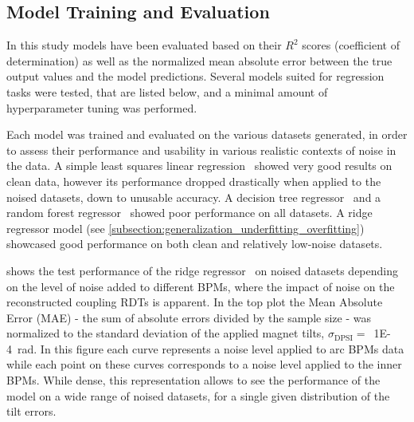 \subsection{Model Training and Evaluation}

In this study models have been evaluated based on their \(R^2\) scores (coefficient of determination) as well as the normalized mean absolute error between the true output values and the model predictions.
Several models suited for regression tasks were tested, that are listed below, and a minimal amount of hyperparameter tuning was performed.

Each model was trained and evaluated on the various datasets generated, in order to assess their performance and usability in various realistic contexts of noise in the data. 
A simple least squares linear regression~\cite{PNAS:Lai:Strong_Consistency_Least_Squares_Estimates_Regression_Models} showed very good results on clean data, however its performance dropped drastically when applied to the noised datasets, down to unusable accuracy.
A decision tree regressor~\cite{BOOK:Breiman:Classification_Regression_Trees} and a random forest regressor~\cite{ML:Breiman:Random_Forests} showed poor performance on all datasets.
A ridge regressor model (see \cref{subsection:generalization_underfitting_overfitting}) showcased good performance on both clean and relatively low-noise datasets.

 shows the test performance of the ridge regressor~\cite{MIT:Rifkin:Regularized_Least_Squares} on noised datasets depending on the level of noise added to different BPMs, where the impact of noise on the reconstructed coupling RDTs is apparent.
In the top plot the Mean Absolute Error (MAE) - the sum of absolute errors divided by the sample size - was normalized to the standard deviation of the applied magnet tilts, \(\sigma_{\mathrm{DPSI}} =\)~\qty{1E-4}{\radian}.
In this figure each curve represents a noise level applied to arc BPMs data while each point on these curves corresponds to a noise level applied to the inner BPMs.
While dense, this representation allows to see the performance of the model on a wide range of noised datasets, for a single given distribution of the tilt errors.

